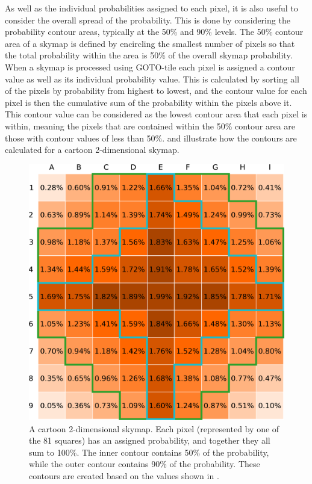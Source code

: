 \begin{colsection}
\begin{colsection}
As well as the individual probabilities assigned to each pixel, it is also useful to consider the overall spread of the probability. This is done by considering the probability contour areas, typically at the 50\% and 90\% levels. The 50\% contour area of a skymap is defined by encircling the smallest number of pixels so that the total probability within the area is 50\% of the overall skymap probability. When a skymap is processed using GOTO-tile each pixel is assigned a contour value as well as its individual probability value. This is calculated by sorting all of the pixels by probability from highest to lowest, and the contour value for each pixel is then the cumulative sum of the probability within the pixels above it. This contour value can be considered as the lowest contour area that each pixel is within, meaning the pixels that are contained within the 50\% contour area are those with contour values of less than 50\%.  and  illustrate how the contours are calculated for a cartoon 2-dimensional skymap.

\makeatletter
\setlength{\@fptop}{1cm}
\makeatother

\begin{figure}[t]
    \begin{center}
        \includegraphics[width=0.95\linewidth]{images/sim/sim_skymap_probs.pdf}
    \end{center}
    \caption[An example 2D probability skymap]{
        A cartoon 2-dimensional skymap. Each pixel (represented by one of the 81 squares) has an assigned probability, and together they all sum to 100\%. The  inner contour contains 50\% of the probability, while the  outer contour contains 90\% of the probability. These contours are created based on the values shown in .
    }\label{fig:sim_skymap_probs}
\end{figure}


\end{colsection}
\end{colsection}
